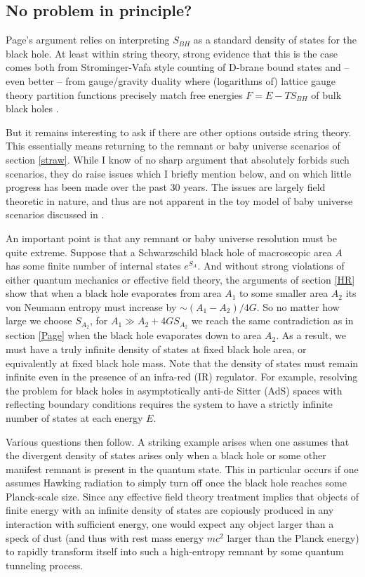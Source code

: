 \documentclass[10pt]{article}
\begin{document}
\subsection{No problem in principle?}
  \label{InfoLoss}
  Page's argument relies on interpreting $S_{BH}$ as a standard density of states for the black hole.  At least within string theory, strong evidence that this is the case comes both from Strominger-Vafa style counting of D-brane bound states \cite{Strominger:1996sh} and -- even better -- from gauge/gravity duality where (logarithms of) lattice gauge theory partition functions precisely match free energies $F =  E-TS_{BH}$ of bulk black holes \cite{Hanada:2008ez,Hanada:2012eg,Hanada:2014hpa}.

But it remains interesting to ask if there are other options outside string theory.  This essentially means returning to the remnant or baby universe scenarios of section \ref{straw}. While I know of no sharp argument that absolutely forbids such scenarios, they do raise issues which I briefly mention below, and on which little progress has been made over the past 30 years.  The issues are largely field theoretic in nature, and thus are not apparent in the toy model of baby universe scenarios discussed in \cite{Unruh:2012vd}.

An important point is that any remnant or baby universe resolution must be quite extreme.  Suppose that a Schwarzschild black hole of macroscopic area $A$ has some finite number of internal states $e^{S_{A}}$.  And without strong violations of either quantum mechanics or effective field theory, the arguments of section \eqref{HR} show that when a black hole evaporates from area $A_1$ to some smaller area $A_2$ its von Neumann entropy must increase by $\sim (A_1 - A_2)/4G$.  So no matter how large we choose $S_{A_2}$, for $A_1 \gg A_2 + 4GS_{A_2}$ we reach the same contradiction as in section \ref{Page} when the black hole evaporates down to area $A_2$.  As a result, we must have a truly infinite density of states at fixed black hole area, or equivalently at fixed black hole mass.  Note that the density of states must remain infinite even in the presence of an infra-red (IR) regulator.  For example, resolving the problem for black holes in asymptotically anti-de Sitter (AdS) spaces with reflecting boundary conditions requires the system to have a strictly infinite number of states at each energy $E$.

Various questions then follow.  A striking example \cite{Giddings:1993km} arises when one assumes that the divergent density of states arises only when a black hole or some other manifest remnant is present in the quantum state.  This in particular occurs if one assumes Hawking radiation to simply turn off once the black hole reaches some Planck-scale size.  Since any effective field theory treatment implies that objects of finite energy with an infinite density of states are copiously produced in any interaction with sufficient energy, one would expect any object larger than a speck of dust (and thus with rest mass energy $mc^2$ larger than the Planck energy) to rapidly transform itself into such a high-entropy remnant by some quantum tunneling process.
\end{document}
